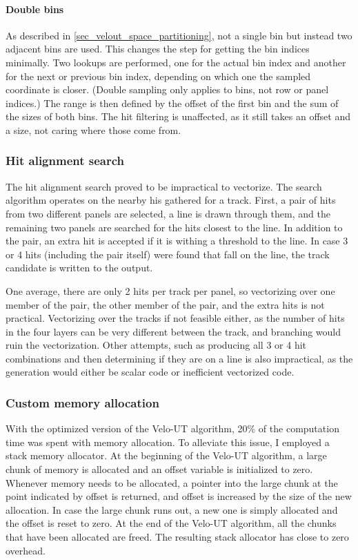 \documentclass[12pt]{article}
\begin{document}
\paragraph{Double bins}

As described in \ref{sec_velout_space_partitioning}, not a single bin but instead two adjacent bins are used. This changes the step for getting the bin indices minimally. Two lookups are performed, one for the actual bin index and another for the next or previous bin index, depending on which one the sampled coordinate is closer. (Double sampling only applies to bins, not row or panel indices.) The range is then defined by the offset of the first bin and the sum of the sizes of both bins. The hit filtering is unaffected, as it still takes an offset and a size, not caring where those come from.


\subsubsection{Hit alignment search}

The hit alignment search proved to be impractical to vectorize. The search algorithm operates on the nearby his gathered for a track. First, a pair of hits from two different panels are selected, a line is drawn through them, and the remaining two panels are searched for the hits closest to the line. In addition to the pair, an extra hit is accepted if it is withing a threshold to the line. In case 3 or 4 hits (including the pair itself) were found that fall on the line, the track candidate is written to the output.

One average, there are only 2 hits per track per panel, so vectorizing over one member of the pair, the other member of the pair, and the extra hits is not practical. Vectorizing over the tracks if not feasible either, as the number of hits in the four layers can be very different between the track, and branching would ruin the vectorization. Other attempts, such as producing all 3 or 4 hit combinations and then determining if they are on a line is also impractical, as the generation would either be scalar code or inefficient vectorized code.

\subsubsection{Custom memory allocation}

With the optimized version of the Velo-UT algorithm, 20\% of the computation time was spent with memory allocation. To alleviate this issue, I employed a stack memory allocator. At the beginning of the Velo-UT algorithm, a large chunk of memory is allocated and an offset variable is initialized to zero. Whenever memory needs to be allocated, a pointer into the large chunk at the point indicated by offset is returned, and offset is increased by the size of the new allocation. In case the large chunk runs out, a new one is simply allocated and the offset is reset to zero. At the end of the Velo-UT algorithm, all the chunks that have been allocated are freed. The resulting stack allocator has close to zero overhead.
\end{document}
